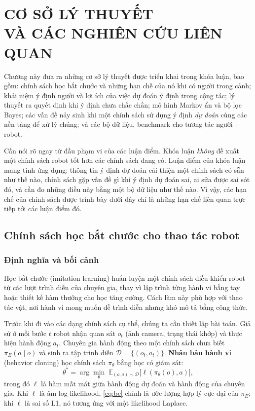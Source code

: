 \chapter[CƠ SỞ LÝ THUYẾT VÀ CÁC NGHIÊN CỨU LIÊN QUAN]{CƠ SỞ LÝ THUYẾT\\VÀ CÁC NGHIÊN CỨU LIÊN QUAN}
\label{chap:background}

Chương này đưa ra những cơ sở lý thuyết được triển khai trong khóa luận, bao gồm: chính sách học bắt chước và những hạn chế của nó khi có người trong cảnh; khái niệm ý định người và lợi ích của việc dự đoán ý định trong cộng tác; lý thuyết ra quyết định khi ý định chưa chắc chắn; mô hình Markov ẩn và bộ lọc Bayes; các vấn đề nảy sinh khi một chính sách sử dụng ý định \emph{dự đoán} cùng các nền tảng để xử lý chúng; và các bộ dữ liệu, benchmark cho tương tác người -- robot.

Cần nói rõ ngay từ đầu phạm vi của các luận điểm. Khóa luận \emph{không} đề xuất một chính sách robot tốt hơn các chính sách đang có. Luận điểm của khóa luận mang tính ứng dụng: thông tin ý định dự đoán cải thiện một chính sách có sẵn như thế nào, chính sách gặp vấn đề gì khi ý định dự đoán sai, ai sửa được sai sót đó, và cần đo những điều này bằng một bộ dữ liệu như thế nào. Vì vậy, các hạn chế của chính sách được trình bày dưới đây chỉ là những hạn chế liên quan trực tiếp tới các luận điểm đó.

\section{Chính sách học bắt chước cho thao tác robot}
\label{sec:bg-act}

\subsection{Định nghĩa và bối cảnh}

Học bắt chước (imitation learning) huấn luyện một chính sách điều khiển robot từ các lượt trình diễn của chuyên gia, thay vì lập trình từng hành vi bằng tay hoặc thiết kế hàm thưởng cho học tăng cường. Cách làm này phù hợp với thao tác vật, nơi hành vi mong muốn dễ trình diễn nhưng khó mô tả bằng công thức.

Trước khi đi vào các dạng chính sách cụ thể, chúng ta cần thiết lập bài toán. Giả sử ở mỗi bước $t$ robot nhận quan sát $o_t$ (ảnh camera, trạng thái khớp) và thực hiện hành động $a_t$. Chuyên gia hành động theo một chính sách chưa biết $\pi_E(a\mid o)$ và sinh ra tập trình diễn $\mathcal{D}=\{(o_t,a_t)\}$. \textbf{Nhân bản hành vi} (behavior cloning) học chính sách $\pi_\theta$ bằng học có giám sát:
\begin{equation}
  \theta^\ast=\arg\min_\theta\;\mathbb{E}_{(o,a)\sim\mathcal{D}}\big[\ell(\pi_\theta(o),a)\big],
  \label{eq:bc}
\end{equation}
trong đó $\ell$ là hàm mất mát giữa hành động dự đoán và hành động của chuyên gia. Khi $\ell$ là âm log-likelihood, \eqref{eq:bc} chính là ước lượng hợp lý cực đại của $\pi_E$; khi $\ell$ là sai số L1, nó tương ứng với một likelihood Laplace.

